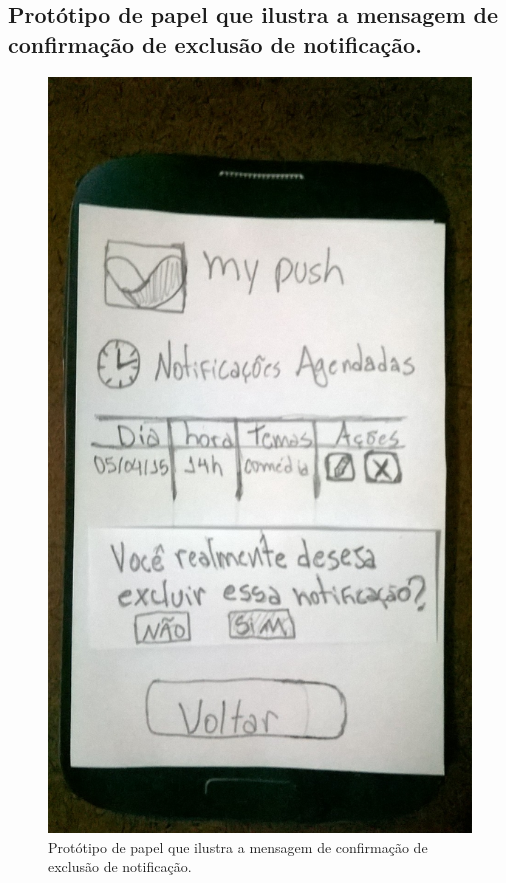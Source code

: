 \begin{anexosenv}
    \pagebreak
    \section*{Protótipo de papel que ilustra a mensagem de confirmação de exclusão de notificação.}
    
      \begin{figure}[!htbp]
	\centering
	\includegraphics[scale=0.32, angle=-90]{editaveis/figuras/prototipo_papel_v1/confirmacao_excluir_notificacao}
	\caption{Protótipo de papel que ilustra a mensagem de confirmação de exclusão de notificação.}
	\label{confirmacao_excluir_notificacao_v1}
      \end{figure}
    

\end{anexosenv}
